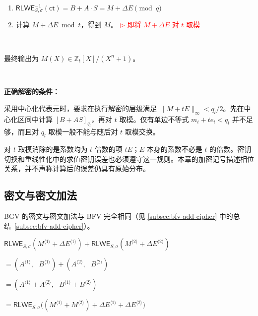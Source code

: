 \begin{tcolorbox}[title={\textbf{\tboxlabel{\ref*{subsec:bgv-enc-dec}} BGV 加密与解密}}]
\begin{enumerate}
\item $\textsf{RLWE}^{-1}_{S,\sigma}(\textsf{ct}) = B + A \cdot S  = M + \Delta E \pmod q$

\item 计算 $M + \Delta E \bmod t$，得到 $M$。\textcolor{red}{ $\rhd$ 即将 $M + \Delta E$ 对 $t$ 取模}

\end{enumerate}

$ $

最终输出为 $M(X) \in \mathbb{Z}_t[X] / (X^n + 1)$。

$ $

\textbf{\underline{正确解密的条件}：}

采用中心化代表元时，要求在执行解密的层级满足 $\|M+tE\|_\infty<q_l/2$。先在中心化区间中计算 $[B+AS]_{q_l}$，再对 $t$ 取模。仅有单边不等式 $m_i+te_i<q_l$ 并不足够，而且对 $q_l$ 取模一般不能与随后对 $t$ 取模交换。


\end{tcolorbox}

对 $t$ 取模消除的是系数均为 $t$ 倍数的项 $tE$；$E$ 本身的系数不必是 $t$ 的倍数。密钥切换和重线性化中的求值密钥误差也必须遵守这一规则。本章的加密记号描述相位关系，并不声称计算后的误差仍具有原始分布。



\subsection{密文与密文加法}
\label{subsec:bgv-add-cipher}

BGV 的密文与密文加法与 BFV 完全相同（见 \autoref{subsec:bfv-add-cipher} 中的总结~\ref*{subsec:bfv-add-cipher}）。


\begin{tcolorbox}[title={\textbf{\tboxlabel{\ref*{subsec:bgv-add-cipher}} BGV 密文与密文加法}}]
$\textsf{RLWE}_{S, \sigma}(M^{\langle 1 \rangle} + \Delta E^{\langle 1 \rangle} ) + \textsf{RLWE}_{S, \sigma}(M^{\langle 2 \rangle} + \Delta E^{\langle 2 \rangle}) $

$ = ( A^{\langle 1 \rangle}, \text{ } B^{\langle 1 \rangle}) + (A^{\langle 2 \rangle}, \text{ } B^{\langle 2 \rangle}) $

$ = ( A^{\langle 1 \rangle} + A^{\langle 2 \rangle}, \text{ } B^{\langle 1 \rangle} + B^{\langle 2 \rangle} ) $

$= \textsf{RLWE}_{S, \sigma}\bm((M^{\langle 1 \rangle} + M^{\langle 2 \rangle})  + \Delta E^{\langle 1 \rangle} + \Delta E^{\langle 2 \rangle} \bm)$
\end{tcolorbox}

